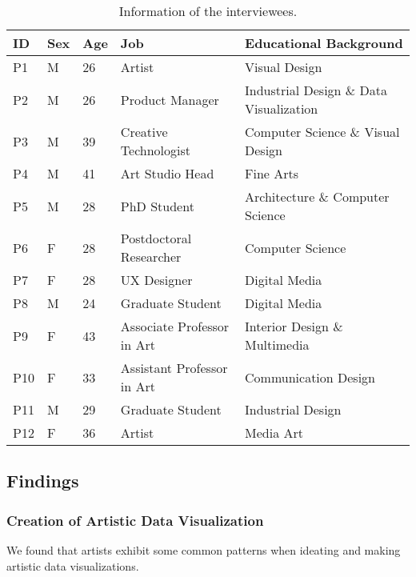 \begin{table}[t!]
\fontsize{6.8pt}{7.5pt}\selectfont
\centering
\caption{Information of the interviewees. }
\label{tab:participants}
\vspace{-1em}
\begin{tabularx}{\columnwidth}{p{0.3em}p{0.3em}p{0.5em}p{10.3em}X}
\toprule
ID &	Sex &	Age &	Job &	Educational Background \\
\midrule
P1	&	M	&	26	&	Artist	&	Visual Design	\\
P2	&	M	&	26	&	Product Manager	&	Industrial Design \& Data Visualization \\
P3	&	M	&	39	&	Creative Technologist	& Computer Science \& Visual Design	\\
P4	&	M	&	41	&	Art Studio Head	&	Fine Arts	\\
P5	&	M	&	28	&	PhD Student	&	Architecture \& Computer Science	\\
P6	&	F	&	28	&	Postdoctoral Researcher	&	Computer Science	\\
P7	&	F	&	28	&	UX Designer	&	Digital Media	\\
P8	&	M	&	24	&	Graduate Student 	& Digital Media	\\
P9	&	F	&	43	&	Associate Professor in Art	&	Interior Design \& Multimedia	\\
P10	&	F	&	33	&	Assistant Professor in Art	& Communication Design \\
P11	&	M	&	29	&	Graduate Student	&	Industrial Design	\\
P12	&	F	&	36	&	Artist	&	Media Art	\\
\bottomrule
\end{tabularx}
\vspace{-1em}
\end{table}







\subsection{Findings}

\subsubsection{Creation of Artistic Data Visualization}
We found that artists exhibit some common patterns when ideating and making artistic data visualizations.


